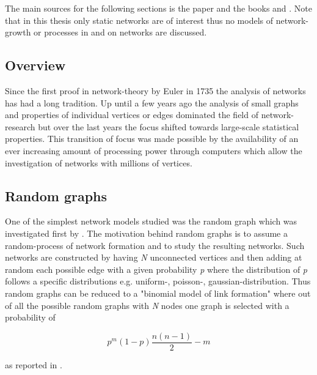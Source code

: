 \documentclass[../Bachelorarbeit.tex]{subfiles}
\begin{document}
The main sources for the following sections is the paper \cite{Newman_ComplexNetworks} and the books \cite{Jackson2008} and \cite{Easley2010}. Note that in this thesis only static networks are of interest thus no models of network-growth or processes in and on networks are discussed.

\subsection{Overview}
Since the first proof in network-theory by Euler in 1735 the analysis of networks has had a long tradition. Up until a few years ago the analysis of small graphs and properties of individual vertices or edges dominated the field of network-research but over the last years the focus shifted towards large-scale statistical properties. This transition of focus was made possible by the availability of an ever increasing amount of processing power through computers which allow the investigation of networks with millions of vertices.

\subsection{Random graphs}
One of the simplest network models studied was the random graph which was investigated first by \cite{ErdosRenyi1959}. The motivation behind random graphs is to assume a random-process of network formation and to study the resulting networks. Such networks are constructed by having \textit{N} unconnected vertices and then adding at random each possible edge with a given probability \textit{p} where the distribution of \textit{p} follows a specific distributions e.g. uniform-, poisson-, gaussian-distribution. Thus random graphs can be reduced to a "binomial model of link formation" \cite{Jackson2008} where out of all the possible random graphs with \textit{N} nodes one graph is selected with a probability of 

\begin{equation}
p^m(1-p) \frac{n(n-1)}{2} - m
\end{equation}

as reported in \cite{Jackson2008}.
\end{document}
